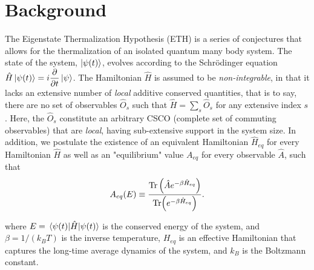 \documentclass[%
reprint,
superscriptaddress,
amsmath,amssymb,
aps,
prb,
showkeys,
]{revtex4-2}
\begin{document}
\section{\label{sec:background} Background}
	
The Eigenstate Thermalization Hypothesis (ETH) is a series of conjectures that allows for the thermalization of an isolated quantum many body system. The state of the system, $\ket{\psi(t)}$, evolves according to the Schr\"odinger equation $\hat{H}\ket{\psi(t)} = i\displaystyle\frac{\partial}{\partial t}\ket{\psi}$. The Hamiltonian $\hat{H}$ is assumed to be \textit{non-integrable}, in that it lacks an extensive number of \textit{local} additive conserved quantities, that is to say, there are no set of observables $\hat{O}_s$ such that $\hat{H}=\sum_s \hat{O}_s$ for any extensive index $s$. Here, the $\hat{O}_s$ constitute an arbitrary CSCO (complete set of commuting observables) that are \textit{local}, having sub-extensive support in the system size. In addition, we postulate the existence of an equivalent Hamiltonian $\hat{H}_{eq}$ for every Hamiltonian $\hat{H}$ as well as an "equilibrium" value $A_{eq}$ for every observable $\hat{A}$, such that
\begin{equation}
	\label{eq:aeq}
 A_{eq}(E)\equiv \frac{\Tr \left(\hat{A}e^{-\beta \hat{H}_{eq}}\right)}{\Tr(e^{-\beta \hat{H}_{eq}})}.
\end{equation}

where $E=\expval{\hat{H}}{\psi(t)}$ is the conserved energy of the system, and $\beta = 1/(k_B T)$ is the inverse temperature, $H_{eq}$ is an effective Hamiltonian that captures the long-time average dynamics of the system, and $k_B$ is the Boltzmann constant.
\end{document}

